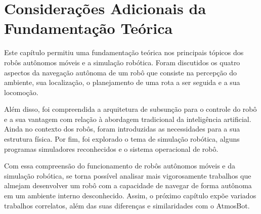 \section{Considerações Adicionais da Fundamentação Teórica}

Este capítulo permitiu uma fundamentação teórica nos principais tópicos dos robôs autônomos móveis e a simulação robótica. Foram discutidos os quatro aspectos da navegação autônoma de um robô que consiste na percepção do ambiente, sua localização, o planejamento de uma rota a ser seguida e a sua locomoção. 

Além disso, foi compreendida a arquitetura de subsunção para o controle do robô e a sua vantagem com relação à abordagem tradicional da inteligência artificial. Ainda no contexto dos robôs, foram introduzidas as necessidades para a sua estrutura física.  Por fim, foi explorado o tema de simulação robótica, alguns programas simuladores reconhecidos e o sistema operacional de robô. 

Com essa compreensão do funcionamento de robôs autônomos móveis e da simulação robótica, se torna possível analisar mais vigorosamente trabalhos que almejam desenvolver um robô com a capacidade de navegar de forma autônoma em um ambiente interno desconhecido. Assim, o próximo capítulo expõe variados trabalhos correlatos, além das suas diferenças e similaridades com o AtmosBot.



